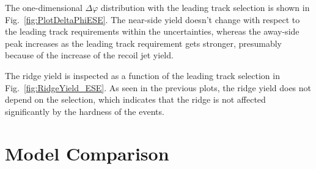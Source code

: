 The one-dimensional $\Delta\varphi$ distribution with the leading track selection is shown in Fig.~\ref{fig:PlotDeltaPhiESE}. The near-side yield doesn't change with respect to the leading track requirements within the uncertainties, whereas the away-side peak increases as the leading track requirement gets stronger, presumably because of the increase of the recoil jet yield.

The ridge yield is inspected as a function of the leading track selection in Fig.~\ref{fig:RidgeYield_ESE}. As seen in the previous plots, the ridge yield does not depend on the selection, which indicates that the ridge is not affected significantly by the hardness of the events.

\section{Model Comparison}
\label{sec:theory}


